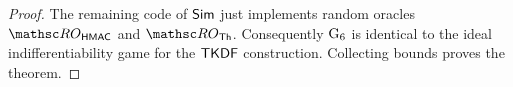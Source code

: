 \begin{proof}
	The remaining code of $\mathsf{Sim}$ just implements random oracles $\ROhmac$ and $\ROthash$.
	Consequently $\textnormal{G}_6$ is identical to the ideal indifferentiability game for the $\mathsf{TKDF}$ construction. 
	Collecting bounds proves the theorem.
	
	
	

\end{proof}
